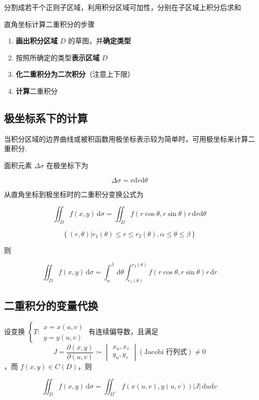 \documentclass[lang = zh , final , oneside , openany , titlepage , zihao = -4 , linespread = 1.3 , baselineskip = false , cjk-font = windows , text-font = newtx , math-font = newtx , math-style = ISO , uppercase-greek = upright , integral-limits = false]{sjtureport}
\begin{document}
分割成若干个正则子区域，利用积分区域可加性，分别在子区域上积分后求和

\begin{remark}
直角坐标计算二重积分的步骤

\begin{enumerate}
\def\labelenumi{\arabic{enumi}.}
\item
  \textbf{画出积分区域} \(D\) 的草图，并\textbf{确定类型}
\item
  按照所确定的类型\textbf{表示区域} \(D\)
\item
  \textbf{化二重积分为二次积分}（注意上下限）
\item
  \textbf{计算}二重积分
\end{enumerate}
\end{remark}

\subsection{极坐标系下的计算}

当积分区域的边界曲线或被积函数用极坐标表示较为简单时，可用极坐标来计算二重积分.

面积元素 \(\Delta \sigma\) 在极坐标下为

\[\boxed{\Delta\sigma= r\mathrm{d}r\mathrm{d}\theta}\]

从直角坐标到极坐标时的二重积分变换公式为

\[\iint_D f(x,y)\,\mathrm{d}\sigma = \iint_D f(r\cos\theta,r\sin\theta)r\,\mathrm{d}r\mathrm{d}\theta\]

\[\left\{\left(r,\theta\right)\left \vert r_1(\theta)\leq r \leq r_2(\theta) , \alpha \leq \theta \leq \beta \right.\right\}\]

则

\[\iint_D f(x,y)\,\mathrm{d}\sigma = \int_\alpha^\beta\, \mathrm{d}\theta\int_{r_1(\theta)}^{r_2(\theta)} f(r\cos\theta,r\sin\theta)r\,\mathrm{d}r\]

\subsection{二重积分的变量代换}

\begin{theorem}
    设变换 \(\left\{\displaystyle T :\begin{aligned}x=x(u,v)\\y=y(u,v)\end{aligned}\right.\) 有连续偏导数，且满足 
    \[\displaystyle J = \frac{\partial (x,y)}{\partial (u,v)}\coloneqq \begin{vmatrix}x_u ,x_v\\ y_u,y_v\end{vmatrix} \left(\text{Jacobi 行列式}\right)\neq 0\]，而 \(f(x,y)\in C(D)\)，则

    \[\iint_D f(x,y)\,\mathrm{d}\sigma = \iint_{D^*} f(x(u,v),y(u,v))\left\vert J \right\vert \,\mathrm{d}u\mathrm{d}v\]
\end{theorem}
\end{document}
